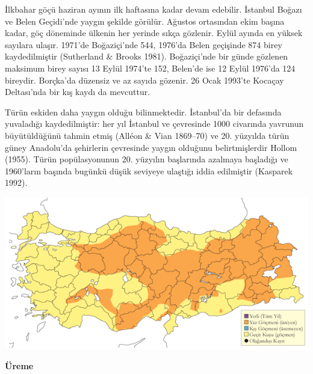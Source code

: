 \documentclass[
  letterpaper,
  DIV=11,
  numbers=noendperiod]{scrreprt}
\begin{document}
İlkbahar göçü haziran ayının ilk haftasına kadar devam edebilir.
İstanbul Boğazı ve Belen Geçidi'nde yaygın şekilde görülür. Ağustos
ortasından ekim başına kadar, göç döneminde ülkenin her yerinde sıkça
gözlenir. Eylül ayında en yüksek sayılara ulaşır. 1971'de Boğaziçi'nde
544, 1976'da Belen geçişinde 874 birey kaydedilmiştir (Sutherland \&
Brooks 1981). Boğaziçi'nde bir günde gözlenen maksimum birey sayısı 13
Eylül 1974'te 152, Belen'de ise 12 Eylül 1976'da 124 bireydir. Borçka'da
düzensiz ve az sayıda gözenir. 26 Ocak 1993'te Kocaçay Deltası'nda bir
kış kaydı da mevcuttur.

Türün eskiden daha yaygın olduğu bilinmektedir. İstanbul'da bir
defasında yuvaladığı kaydedilmiştir: her yıl İstanbul ve çevresinde 1000
civarında yavrunun büyütüldüğünü tahmin etmiş (Alléon \& Vian 1869--70)
ve 20. yüzyılda türün güney Anadolu'da şehirlerin çevresinde yaygın
olduğunu belirtmişlerdir Hollom (1955). Türün popülasyonunun 20.
yüzyılın başlarında azalmaya başladığı ve 1960'ların başında bugünkü
düşük seviyeye ulaştığı iddia edilmiştir (Kasparek 1992).

\includegraphics{images/harita_Page_084.png}

\textbf{Üreme}
\end{document}
